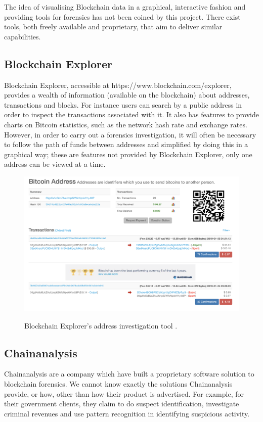 The idea of visualising Blockchain data in a graphical, interactive fashion and providing tools for forensics has not been coined by this project. There exist tools, both freely available and proprietary, that aim to deliver similar capabilities. 

\subsection{Blockchain Explorer}
Blockchain Explorer, accessible at https://www.blockchain.com/explorer, provides a wealth of information (available on the blockchain) about addresses, transactions and blocks. For instance users can search by a public address in order to inspect the transactions associated with it. It also has features to provide charts on Bitcoin statistics, such as the network hash rate and exchange rates. However, in order to carry out a forensics investigation, it will often be necessary to follow the path of funds between addresses and simplified by doing this in a graphical way; these are features not provided by Blockchain Explorer, only one address can be viewed at a time. 

\begin{figure}[h!]
  \centering
  \includegraphics[width = 15cm]{./figures/chainanalysis}\\[0.5cm] 
  \caption{Blockchain Explorer's address investigation tool \cite{RefWorks:doc:5c4b1022e4b01a524cf4a1d3}.}
\end{figure}

\subsection{Chainanalysis}
Chainanalysis are a company which have built a proprietary software solution to blockchain forensics. We cannot know exactly the solutions Chainanalysis provide, or how, other than how their product is advertised. For example, for their government clients, they claim to do suspect identification, investigate criminal revenues and use pattern recognition in identifying suspicious activity. 

